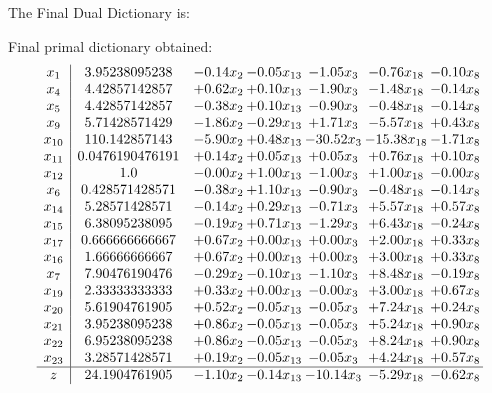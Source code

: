 \documentclass[8pt]{article}
\begin{document}
The Final Dual Dictionary is: 

 Final primal dictionary obtained: 
\[\begin{array}{c| c c@{\hskip 2pt} c@{\hskip 2pt} c@{\hskip 2pt} c@{\hskip 2pt} c@{\hskip 2pt} }
 x_{1}   &  3.95238095238 & -0.14 x_{2} & -0.05 x_{13} & -1.05 x_{3} & -0.76 x_{18} & -0.10 x_{8}\\
 x_{4}   &  4.42857142857 & +  0.62 x_{2} & +  0.10 x_{13} & -1.90 x_{3} & -1.48 x_{18} & -0.14 x_{8}\\
 x_{5}   &  4.42857142857 & -0.38 x_{2} & +  0.10 x_{13} & -0.90 x_{3} & -0.48 x_{18} & -0.14 x_{8}\\
 x_{9}   &  5.71428571429 & -1.86 x_{2} & -0.29 x_{13} & +  1.71 x_{3} & -5.57 x_{18} & +  0.43 x_{8}\\
 x_{10}   &  110.142857143 & -5.90 x_{2} & +  0.48 x_{13} & -30.52 x_{3} & -15.38 x_{18} & -1.71 x_{8}\\
 x_{11}   &  0.0476190476191 & +  0.14 x_{2} & +  0.05 x_{13} & +  0.05 x_{3} & +  0.76 x_{18} & +  0.10 x_{8}\\
 x_{12}   &  1.0 & -0.00 x_{2} & +  1.00 x_{13} & -1.00 x_{3} & +  1.00 x_{18} & -0.00 x_{8}\\
 x_{6}   &  0.428571428571 & -0.38 x_{2} & +  1.10 x_{13} & -0.90 x_{3} & -0.48 x_{18} & -0.14 x_{8}\\
 x_{14}   &  5.28571428571 & -0.14 x_{2} & +  0.29 x_{13} & -0.71 x_{3} & +  5.57 x_{18} & +  0.57 x_{8}\\
 x_{15}   &  6.38095238095 & -0.19 x_{2} & +  0.71 x_{13} & -1.29 x_{3} & +  6.43 x_{18} & -0.24 x_{8}\\
 x_{17}   &  0.666666666667 & +  0.67 x_{2} & +  0.00 x_{13} & +  0.00 x_{3} & +  2.00 x_{18} & +  0.33 x_{8}\\
 x_{16}   &  1.66666666667 & +  0.67 x_{2} & +  0.00 x_{13} & +  0.00 x_{3} & +  3.00 x_{18} & +  0.33 x_{8}\\
 x_{7}   &  7.90476190476 & -0.29 x_{2} & -0.10 x_{13} & -1.10 x_{3} & +  8.48 x_{18} & -0.19 x_{8}\\
 x_{19}   &  2.33333333333 & +  0.33 x_{2} & +  0.00 x_{13} & -0.00 x_{3} & +  3.00 x_{18} & +  0.67 x_{8}\\
 x_{20}   &  5.61904761905 & +  0.52 x_{2} & -0.05 x_{13} & -0.05 x_{3} & +  7.24 x_{18} & +  0.24 x_{8}\\
 x_{21}   &  3.95238095238 & +  0.86 x_{2} & -0.05 x_{13} & -0.05 x_{3} & +  5.24 x_{18} & +  0.90 x_{8}\\
 x_{22}   &  6.95238095238 & +  0.86 x_{2} & -0.05 x_{13} & -0.05 x_{3} & +  8.24 x_{18} & +  0.90 x_{8}\\
 x_{23}   &  3.28571428571 & +  0.19 x_{2} & -0.05 x_{13} & -0.05 x_{3} & +  4.24 x_{18} & +  0.57 x_{8}\\
\hline
z    &  24.1904761905 & -1.10 x_{2} & -0.14 x_{13} & -10.14 x_{3} & -5.29 x_{18} & -0.62 x_{8}\\
\end{array}\]
\end{document}
